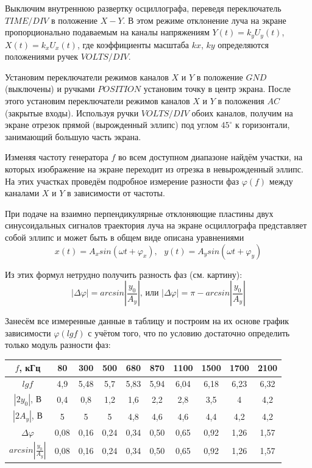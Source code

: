 \documentclass[a4paper, 12pt]{article} %
\begin{document}
Выключим внутреннюю развертку осциллографа, переведя переключатель $TIME/DIV$ в положение $X - Y$. В этом режиме отклонение луча на экране пропорционально подаваемым на каналы напряжениям $Y(t) = k_y U_y (t)$, $X(t) = k_x U_x (t)$, где коэффициенты
масштаба $kx$, $ky$ определяются положениями ручек $VOLTS/DIV$.

Установим переключатели режимов каналов $X$ и $Y$ в положение $GND$ (выключены) и ручками $POSITION$ установим точку в центр экрана. После этого установим переключатели режимов каналов $X$ и $Y$ в положения $AC$ (закрытые входы). Используя ручки
$VOLTS/DIV$ обоих каналов, получим на экране отрезок прямой
(вырожденный эллипс) под углом $45^{\circ}$ к горизонтали, занимающий
большую часть экрана.

Изменяя частоту генератора $f$ во всем доступном диапазоне найдём участки, на которых изображение на экране переходит из отрезка в невырожденный эллипс. На этих участках проведём подробное измерение разности фаз $ \varphi (f)$ между каналами $X$ и $Y$ в
зависимости от частоты.

При подаче на взаимно перпендикулярные отклоняющие пластины двух синусоидальных сигналов траектория луча на экране
осциллографа представляет собой эллипс и может быть в общем
виде описана уравнениями
\[x(t) = A_x sin(\omega t + \varphi_x), \text{ } y(t) = A_y sin(\omega t + \varphi_y)\]

Из этих формул нетрудно получить разность фаз (см. картину):
\[|\Delta \varphi| = arcsin | \frac{y_0}{A_y}| \text{, или } |\Delta \varphi| = \pi - arcsin | \frac{y_0}{A_y}|\]

Занесём все измеренные данные в таблицу и построим на их основе график зависимости $\varphi (lgf)$ с учётом того, что по условию достаточно определить только модуль разности фаз:

\begin{center}
\begin{tabular}{|c|c|c|c|c|c|c|c|c|c|}
\hline 
$f$, кГц & 80 & 300 & 500 & 680 & 870 & 1100 & 1500 & 1700 & 2100  \\ 
\hline 
$lgf$ & 4,9 & 5,48 & 5,7 & 5,83 & 5,94 & 6,04 & 6,18 & 6,23 & 6,32  \\ 
\hline 
$|2y_0|$, В & 0,4 & 0,8 & 1,2 & 1,6 & 2,2 & 2,8 & 3,5 & 4 & 4,2   \\ 
\hline 
$|2A_y|$, В & 5 & 5 & 5 & 4,8 & 4,6 & 4,6 & 4,4 & 4,2 & 4,2 \\ 
\hline 
$\Delta \varphi$ & 0,08 & 0,16 & 0,24 & 0,34 & 0,50 & 0,65 & 0,92 & 1,26 & 1,57  \\
\hline 
$arcsin | \frac{y_0}{A_y}|$ & 0,08 & 0,16 & 0,24 & 0,34 & 0,50 & 0,65 & 0,92 & 1,26 & 1,57  \\ 
\hline 
\end{tabular} 
\end{center}
\end{document}
